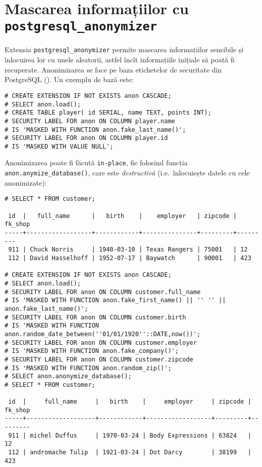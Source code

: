 \section{Mascarea informațiilor cu \texttt{postgresql\_anonymizer}}

Extensia \texttt{postgresql\_anonymizer} permite mascarea informațiilor
sensibile și înlocuirea lor cu unele aleatorii, astfel încît informațiile
inițiale să poată fi recuperate. Anonimizarea se face pe baza etichetelor
de securitate din PostgreSQL (\cite{psqlsecl}). Un exemplu de bază este:
{
  \small
\begin{verbatim}
# CREATE EXTENSION IF NOT EXISTS anon CASCADE;
# SELECT anon.load();
# CREATE TABLE player( id SERIAL, name TEXT, points INT);
# SECURITY LABEL FOR anon ON COLUMN player.name 
# IS 'MASKED WITH FUNCTION anon.fake_last_name()';
# SECURITY LABEL FOR anon ON COLUMN player.id
# IS 'MASKED WITH VALUE NULL';
\end{verbatim}
}

Anonimizarea poate fi făcută \texttt{in-place}, fie folosind funcția
\texttt{anon.anymize\_database()}, care este \emph{destructivă} (i.e.\ înlocuiește
datele cu cele anonimizate):
{
  \small
\begin{verbatim}
# SELECT * FROM customer;

 id  |   full_name      |   birth    |    employer   | zipcode | fk_shop
-----+------------------+------------+---------------+---------+---------
 911 | Chuck Norris     | 1940-03-10 | Texas Rangers | 75001   | 12
 112 | David Hasselhoff | 1952-07-17 | Baywatch      | 90001   | 423

# CREATE EXTENSION IF NOT EXISTS anon CASCADE;
# SELECT anon.load();
# SECURITY LABEL FOR anon ON COLUMN customer.full_name 
# IS 'MASKED WITH FUNCTION anon.fake_first_name() || '' '' || anon.fake_last_name()';
# SECURITY LABEL FOR anon ON COLUMN customer.birth   
# IS 'MASKED WITH FUNCTION anon.random_date_between(''01/01/1920''::DATE,now())';
# SECURITY LABEL FOR anon ON COLUMN customer.employer
# IS 'MASKED WITH FUNCTION anon.fake_company()';
# SECURITY LABEL FOR anon ON COLUMN customer.zipcode
# IS 'MASKED WITH FUNCTION anon.random_zip()';
# SELECT anon.anonymize_database();
# SELECT * FROM customer;

 id  |     full_name     |   birth    |     employer     | zipcode | fk_shop
-----+-------------------+------------+------------------+---------+---------
 911 | michel Duffus     | 1970-03-24 | Body Expressions | 63824   | 12
 112 | andromache Tulip  | 1921-03-24 | Dot Darcy        | 38199   | 423
\end{verbatim}
}

